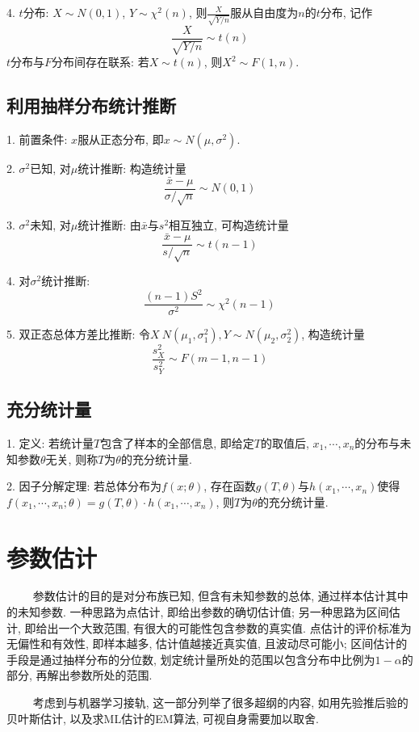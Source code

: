 4. $t$分布: $X \sim N(0,1)$, $Y \sim \chi^2(n)$, 则$\frac{X}{\sqrt{Y/n}}$服从自由度为$n$的$t$分布, 记作
\begin{equation*}
    \frac{X}{\sqrt{Y/n}} \sim t(n)
\end{equation*}
$t$分布与$F$分布间存在联系: 若$X \sim t(n)$,  则$X^2 \sim F(1,n)$.

\subsection{利用抽样分布统计推断}

1. 前置条件: $x$服从正态分布, 即$x \sim N(\mu, \sigma^2)$.

2. $\sigma^2$已知, 对$\mu$统计推断: 构造统计量
\begin{equation*}
    \frac{\bar{x}-\mu}{\sigma/\sqrt{n}} \sim N(0,1)
\end{equation*}


3. $\sigma^2$未知, 对$\mu$统计推断: 由$\bar{x}$与$s^2$相互独立, 可构造统计量
\begin{equation*}
    \frac{\bar{x}-\mu}{s/\sqrt{n}} \sim t(n-1)
\end{equation*}

4. 对$\sigma^2$统计推断:
\begin{equation*}
    \frac{(n-1)S^2}{\sigma^2} \sim \chi^2(n-1)
\end{equation*}

5. 双正态总体方差比推断: 令$X~N(\mu_1,\sigma_1^2), Y\sim N(\mu_2,\sigma_2^2)$, 构造统计量
\begin{equation*}
    \frac{s_X^2}{s_Y^2} \sim F(m-1,n-1)
\end{equation*}

\subsection{充分统计量}

1. 定义: 若统计量$T$包含了样本的全部信息, 即给定$T$的取值后, $x_1,\cdots, x_n$的分布与未知参数$\theta$无关, 则称$T$为$\theta$的充分统计量.

2. 因子分解定理: 若总体分布为$f(x;\theta)$, 存在函数$g(T,\theta)$与$h(x_1,\cdots,x_n)$使得$f(x_1,\cdots,x_n;\theta)=g(T,\theta)\cdot h(x_1,\cdots,x_n)$, 则$T$为$\theta$的充分统计量.

\section{参数估计}

\begin{tcolorbox}[colback=red!5,colframe=red!75!black]
    ~~~~ 参数估计的目的是对分布族已知, 但含有未知参数的总体, 通过样本估计其中的未知参数. 一种思路为点估计, 即给出参数的确切估计值; 另一种思路为区间估计, 即给出一个大致范围, 有很大的可能性包含参数的真实值. 点估计的评价标准为无偏性和有效性, 即样本越多, 估计值越接近真实值, 且波动尽可能小; 
    区间估计的手段是通过抽样分布的分位数, 划定统计量所处的范围以包含分布中比例为$1-\alpha$的部分, 再解出参数所处的范围.

    ~~~~ 考虑到与机器学习接轨, 这一部分列举了很多超纲的内容, 如用先验推后验的贝叶斯估计, 以及求ML估计的EM算法, 可视自身需要加以取舍.
\end{tcolorbox}

